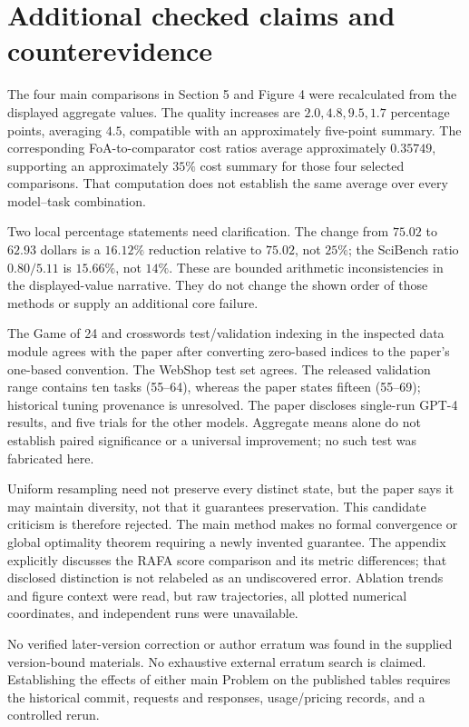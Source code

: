 \documentclass[10pt]{article}
\begin{document}
\section*{Additional checked claims and counterevidence}
The four main comparisons in Section 5 and Figure 4 were recalculated from the displayed aggregate values. The quality increases are \(2.0,4.8,9.5,1.7\) percentage points, averaging \(4.5\), compatible with an approximately five-point summary. The corresponding FoA-to-comparator cost ratios average approximately \(0.35749\), supporting an approximately \(35\%\) cost summary for those four selected comparisons. That computation does not establish the same average over every model–task combination.\par
Two local percentage statements need clarification. The change from \(75.02\) to \(62.93\) dollars is a \(16.12\%\) reduction relative to \(75.02\), not \(25\%\); the SciBench ratio \(0.80/5.11\) is \(15.66\%\), not \(14\%\). These are bounded arithmetic inconsistencies in the displayed-value narrative. They do not change the shown order of those methods or supply an additional core failure.\par
The Game of 24 and crosswords test/validation indexing in the inspected data module agrees with the paper after converting zero-based indices to the paper’s one-based convention. The WebShop test set agrees. The released validation range contains ten tasks (55–64), whereas the paper states fifteen (55–69); historical tuning provenance is unresolved. The paper discloses single-run GPT-4 results, and five trials for the other models. Aggregate means alone do not establish paired significance or a universal improvement; no such test was fabricated here.\par
Uniform resampling need not preserve every distinct state, but the paper says it may maintain diversity, not that it guarantees preservation. This candidate criticism is therefore rejected. The main method makes no formal convergence or global optimality theorem requiring a newly invented guarantee. The appendix explicitly discusses the RAFA score comparison and its metric differences; that disclosed distinction is not relabeled as an undiscovered error. Ablation trends and figure context were read, but raw trajectories, all plotted numerical coordinates, and independent runs were unavailable.\par
No verified later-version correction or author erratum was found in the supplied version-bound materials. No exhaustive external erratum search is claimed. Establishing the effects of either main Problem on the published tables requires the historical commit, requests and responses, usage/pricing records, and a controlled rerun.\par
\end{document}
